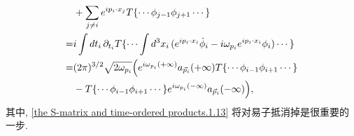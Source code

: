 \begin{itemize}
\begin{align}
		& + \sum_{j \neq i} e^{i p_i \cdot x_j} T\{\cdots \phi_{j - 1} \phi_{j + 1} \cdots\} \label{the S-matrix and time-ordered products.1.13} \\
		=& i \int dt_i \, \partial_{t_i} T\{\cdots \int d^3 x_i \, (e^{i p_i \cdot x_i} \dot{\phi}_i - i \omega_{p_i} e^{i p_i \cdot x_i} \phi_i) \cdots\} \notag \\
		=& (2 \pi)^{3 / 2} \sqrt{2 \omega_{p_i}} \Big( e^{i \omega_{p_i} (+ \infty)} a_{\vec{p}_i}(+ \infty) T\{\cdots \phi_{i - 1} \phi_{i + 1} \cdots\} \notag \\
		& - T\{\cdots \phi_{i - 1} \phi_{i + 1} \cdots\} e^{i \omega_{p_i} (- \infty)} a_{\vec{p}_i}(- \infty) \Big),
	\end{align}
	其中, \eqref{the S-matrix and time-ordered products.1.13} 将对易子抵消掉是很重要的一步.
\end{itemize}

